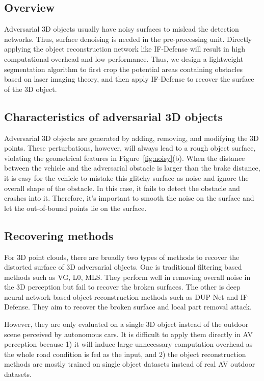 \subsection{Overview}

Adversarial 3D objects usually have noisy surfaces to mislead the detection networks.
Thus, surface denoising is needed in the pre-processing unit.
Directly applying the object reconstruction network like IF-Defense\cite{if-defense} will result in high computational overhead and low performance.
Thus, we design a lightweight segmentation algorithm to first crop the potential areas containing obstacles based on laser imaging theory,
and then apply IF-Defense\cite{if-defense} to recover the surface of the 3D object. 

\subsection{Characteristics of adversarial 3D objects}

Adversarial 3D objects are generated by adding, removing, and modifying the 3D points.
These perturbations, however, will always lead to a rough object surface, violating the geometrical features in Figure~\ref{fig:noisy}(b).
When the distance between the vehicle and the adversarial obstacle is larger than the brake distance,
it is easy for the vehicle to mistake this glitchy surface as noise and ignore the overall shape of the obstacle.
In this case, it fails to detect the obstacle and crashes into it.
Therefore, it's important to smooth the noise on the surface and let the out-of-bound points lie on the surface.

\subsection{Recovering methods}

For 3D point clouds, there are broadly two types of methods to recover the distorted surface of 3D adversarial objects.
One is traditional filtering based methods such as VG\cite{VG}, L0\cite{L0}, MLS\cite{mls}. They perform well in removing overall noise in the 3D perception but fail to recover the broken surfaces.
The other is deep neural network based object reconstruction methods such as DUP-Net\cite{dupnet} and IF-Defense\cite{if-defense}.
They aim to recover the broken surface and local part removal attack.

However, they are only evaluated on a single 3D object instead of the outdoor scene perceived by autonomous cars.
It is difficult to apply them directly in AV perception because 1) it will induce large unnecessary computation overhead as the whole road condition is fed as the input, 
and 2) the object reconstruction methods are mostly trained on single object datasets instead of real AV outdoor datasets.

